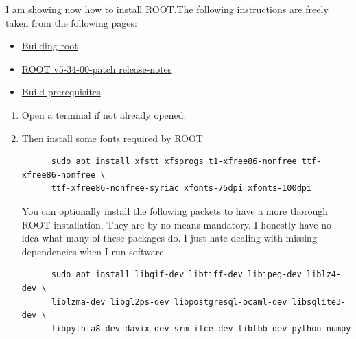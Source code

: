 I am showing now how to install ROOT.\@ The following instructions are freely
taken from the following pages:
\begin{itemize}
\item \href{https://root.cern.ch/building-root}{Building root}
\item
  \href{https://d35c7d8c.web.cern.ch/root-version-v5-34-00-patch-release-notes}%
  {ROOT v5-34-00-patch release-notes}
\item \href{https://root.cern.ch/build-prerequisites}{Build prerequisites}
\end{itemize}

\begin{enumerate}[resume]
\item Open a terminal if not already opened.
\item\label{root-1} Then install some fonts required by ROOT%
\begin{lstlisting}
      sudo apt install xfstt xfsprogs t1-xfree86-nonfree ttf-xfree86-nonfree \
      ttf-xfree86-nonfree-syriac xfonts-75dpi xfonts-100dpi
\end{lstlisting}
  You can optionally install the following packets to have a more thorough ROOT
  installation. They are by no means mandatory. I honestly have no idea what
  many of these packages do. I just hate dealing with missing dependencies when
  I run software.
\begin{lstlisting}
      sudo apt install libgif-dev libtiff-dev libjpeg-dev liblz4-dev \
      liblzma-dev libgl2ps-dev libpostgresql-ocaml-dev libsqlite3-dev \
      libpythia8-dev davix-dev srm-ifce-dev libtbb-dev python-numpy
\end{lstlisting}
  

\end{enumerate}
